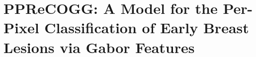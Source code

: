 \chapter{PPReCOGG: A Model for the Per-Pixel Classification of Early Breast Lesions via Gabor Features}


\newpage


